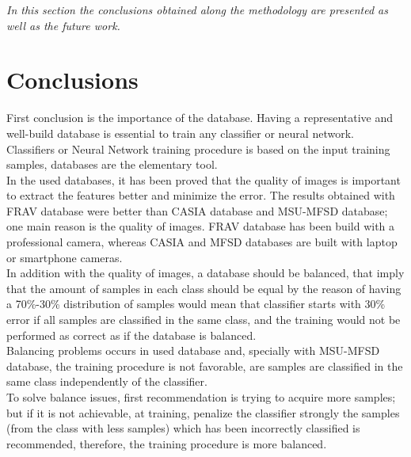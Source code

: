 
\begin{small}
\emph{In this section the conclusions obtained along the methodology are presented as well as the future work.\\}
\end{small}

\section{Conclusions}
First conclusion is the importance of the database. Having a representative and well-build database is essential to train any classifier or neural network.\\

Classifiers or Neural Network training procedure is based on the input training samples, databases are the elementary tool.\\

In the used databases, it has been proved that the quality of images is important to extract the features better and minimize the error. The results obtained with FRAV database were better than CASIA database and MSU-MFSD database; one main reason is the quality of images. FRAV database has been build with a professional camera, whereas CASIA and MFSD databases are built with laptop or smartphone cameras.\\

In addition with the quality of images, a database should be balanced, that imply that the amount of samples in each class should be equal by the reason of having a 70\%-30\% distribution of samples would mean that classifier starts with 30\% error if all samples are classified in the same class, and the training would not be performed as correct as if the database is balanced.\\

Balancing problems occurs in used database and, specially with MSU-MFSD database, the training procedure is not favorable, are samples are classified in the same class independently of the classifier.\\

To solve balance issues, first recommendation is trying to acquire more samples; but if it is not achievable, at training, penalize the classifier strongly the samples (from the class with less samples) which has been incorrectly classified is recommended, therefore, the training procedure is more balanced.\\
 
